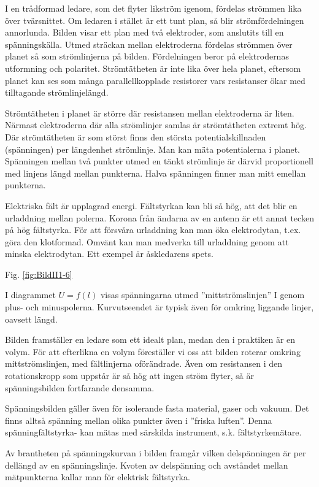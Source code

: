 I en trådformad ledare, som det flyter likström igenom, fördelas strömmen lika
över tvärsnittet. Om ledaren i stället är ett tunt plan, så blir
strömfördelningen annorlunda. Bilden visar ett plan med två elektroder, som
anslutits till en spänningskälla. Utmed sträckan mellan elektroderna fördelas
strömmen över planet så som strömlinjerna på bilden. Fördelningen beror på
elektrodernas utformning och polaritet. Strömtätheten är inte lika över hela
planet, eftersom planet kan ses som många parallellkopplade resistorer vars
resistanser ökar med tilltagande strömlinjelängd.

Strömtätheten i planet är större där resistansen mellan elektroderna är liten.
Närmast elektroderna där alla strömlinjer samlas är strömtätheten extremt hög.
Där strömtätheten är som störst finns den största potentialskillnaden
(spänningen) per längdenhet strömlinje. Man kan mäta potentialerna i planet.
Spänningen mellan två punkter utmed en tänkt strömlinje är därvid proportionell
med linjens längd mellan punkterna. Halva spänningen finner man mitt emellan
punkterna.

Elektriska fält är upplagrad energi. Fältstyrkan kan bli så hög, att det blir
en urladdning mellan polerna. Korona från ändarna av en antenn är ett annat
tecken på hög fältstyrka. För att försvåra urladdning kan man öka elektrodytan,
t.ex. göra den klotformad. Omvänt kan man medverka till urladdning genom att
minska elektrodytan. Ett exempel är åskledarens spets.

Fig. \ref{fig:BildII1-6}

I diagrammet \(U = f(l)\) visas spänningarna utmed ''mittströmslinjen'' I genom
plus- och minuspolerna. Kurvutseendet är typisk även för omkring liggande
linjer, oavsett längd.

Bilden framställer en ledare som ett idealt plan, medan den i praktiken är en
volym. För att efterlikna en volym föreställer vi oss att bilden roterar
omkring mittströmslinjen, med fältlinjerna oförändrade. Även om resistansen i
den rotationskropp som uppstår är så hög att ingen ström flyter, så är
spänningsbilden fortfarande densamma.

Spänningsbilden gäller även för isolerande fasta material, gaser och vakuum.
Det finns alltså spänning mellan olika punkter även i ''friska luften''. Denna
spänningfältstyrka- kan mätas med särskilda instrument, s.k. fältstyrkemätare.

Av brantheten på spänningskurvan i bilden framgår vilken delspänningen är per
dellängd av en spänningslinje. Kvoten av delspänning och avståndet mellan
mätpunkterna kallar man för elektrisk fältstyrka.

